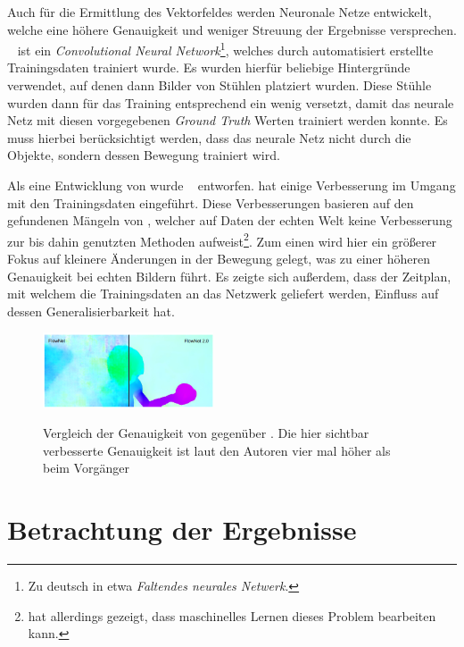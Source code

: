 Auch für die Ermittlung des Vektorfeldes werden Neuronale Netze entwickelt, welche eine höhere Genauigkeit und weniger Streuung der Ergebnisse versprechen.
~\cite{Fischer2015} ist ein \textit{Convolutional Neural Network}\footnote{Zu deutsch in etwa \textit{Faltendes neurales Netwerk}.}, welches durch automatisiert erstellte Trainingsdaten trainiert wurde.
Es wurden hierfür beliebige Hintergründe verwendet, auf denen dann Bilder von Stühlen platziert wurden.
Diese Stühle wurden dann für das Training entsprechend ein wenig versetzt, damit das neurale Netz mit diesen vorgegebenen \textit{Ground Truth} Werten trainiert werden konnte.
Es muss hierbei berücksichtigt werden, dass das neurale Netz nicht durch die Objekte, sondern dessen Bewegung trainiert wird.

Als eine Entwicklung von  wurde ~\cite{Ilg2016} entworfen.
 hat einige Verbesserung im Umgang mit den Trainingsdaten eingeführt.
Diese Verbesserungen basieren auf den gefundenen Mängeln von , welcher auf Daten der echten Welt keine Verbesserung zur bis dahin genutzten Methoden aufweist\footnote{ hat allerdings gezeigt, dass maschinelles Lernen dieses Problem bearbeiten kann.}.
Zum einen wird hier ein grö{\ss}erer Fokus auf kleinere Änderungen in der Bewegung gelegt, was zu einer höheren Genauigkeit bei echten Bildern führt.
Es zeigte sich au{\ss}erdem, dass der Zeitplan, mit welchem die Trainingsdaten an das Netzwerk geliefert werden, Einfluss auf dessen Generalisierbarkeit hat.

\begin{figure}
    \centering
    \includegraphics[width=0.45\textwidth]{gfx/flownet_vs_flownet2.png}
    \label{fig:flownet_vs_flownet2}
    \caption[Vergleich  zu ]{Vergleich der Genauigkeit von  gegenüber . Die hier sichtbar verbesserte Genauigkeit ist laut den Autoren vier mal höher als beim Vorgänger~\cite{Ilg2016}}
\end{figure}

\section{Betrachtung der Ergebnisse}

